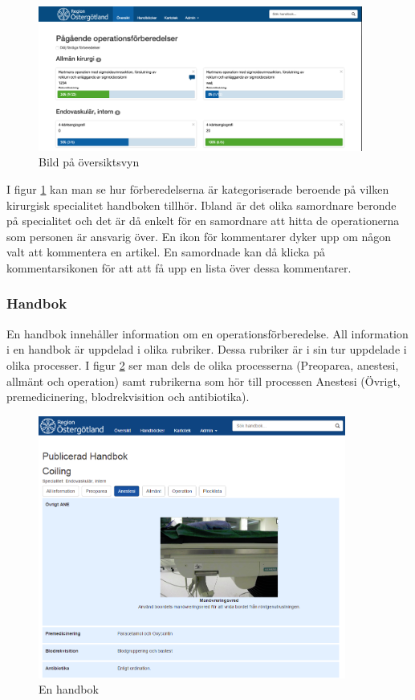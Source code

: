 \begin{figure}[h!]
  \centering
  \includegraphics[width=0.95\textwidth]{images/site/overview.png}
  \caption{Bild på översiktsvyn}
  \label{fig:siteoverview}
\end{figure}

I figur \ref{fig:siteoverview} kan man se hur förberedelserna är kategoriserade beroende på vilken kirurgisk specialitet handboken tillhör.
Ibland är det olika samordnare beronde på specialitet och det är då enkelt för en samordnare att hitta de operationerna som personen är ansvarig över.
En ikon för kommentarer dyker upp om någon valt att kommentera en artikel. En samordnade kan då klicka på kommentarsikonen för att att få upp en lista över dessa kommentarer.

\subsubsection{Handbok}
En handbok innehåller information om en operationsförberedelse. All information i en handbok är uppdelad i olika rubriker. Dessa rubriker är i sin tur uppdelade i olika processer.
I figur \ref{fig:handbok} ser man dels de olika processerna (Preoparea, anestesi, allmänt och operation) samt rubrikerna som hör till processen Anestesi (Övrigt, premedicinering, blodrekvisition och  antibiotika).

\begin{figure}
  \centering
  \includegraphics[width=0.9\textwidth]{images/site/handbok.png}
  \caption{En handbok}
  \label{fig:handbok}
\end{figure}

